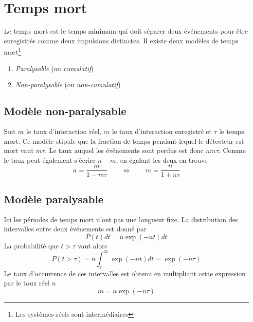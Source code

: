 \section{Temps mort}%
Le temps mort est le temps minimum qui doit séparer deux événements
pour être enregistrés comme deux impulsions distinctes. Il existe
deux modèles de temps mort\footnote{Les systèmes réels sont 
intermédiaires}
\begin{enumerate}
\item \textit{Paralysable} (ou \textit{cumulatif})
\item \textit{Non-paralysable} (ou \textit{non-cumulatif})
\end{enumerate}

\subsection{Modèle non-paralysable}
Soit $m$ le taux d'interaction réel, $m$ le taux d'interaction 
enregistré et $\tau$ le temps mort. Ce modèle stipule que la 
fraction de temps pendant lequel le détecteur est mort vaut
$m\tau$. Le taux auquel les événements sont perdus est donc 
$nm\tau$. Comme le taux peut également s'écrire $n-m$, en 
égalant les deux on trouve
\begin{equation}
n=\frac{m}{1-m\tau}\qquad\Leftrightarrow\qquad 
m=\frac{n}{1+n\tau}
\end{equation}

\subsection{Modèle paralysable}
Ici les périodes de temps mort n'ont pas une longueur fixe. La
distribution des intervalles entre deux événements est donné par
\begin{equation}
P(t)dt=n\exp{(-nt)}dt
\end{equation}
La probabilité que $t>\tau$ vaut alors
\begin{equation}
P(t>\tau)=n\int_\tau^\infty \exp{(-nt)}dt=\exp{(-n\tau)}
\end{equation}
Le taux d'occurrence de ces intervalles est obtenu en 
multipliant cette expression par le taux réel $n$
\begin{equation}
m=n\exp{(-n\tau)}
\end{equation}



